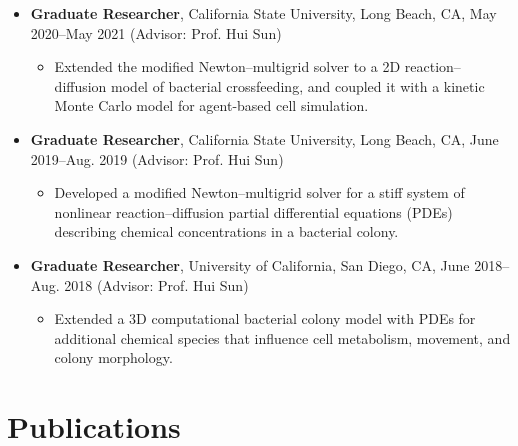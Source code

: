 \documentclass[11pt]{article}
\begin{document}
\begin{itemize}
\item {\bf Graduate Researcher}, California State University, Long
  Beach, CA, May 2020--May 2021 (Advisor: Prof. Hui Sun)
  \begin{itemize}
  \item Extended the modified Newton--multigrid solver to a 2D
    reaction--diffusion model of bacterial crossfeeding, and coupled it
    with a kinetic Monte Carlo model for agent-based cell simulation.
  \end{itemize}
\item {\bf Graduate Researcher}, California State University, Long
  Beach, CA, June 2019--Aug. 2019 (Advisor: Prof. Hui Sun)
  \begin{itemize}
  \item Developed a modified Newton--multigrid solver for a stiff system
    of nonlinear reaction--diffusion partial differential equations
    (PDEs) describing chemical concentrations in a bacterial colony.
  \end{itemize}
\item {\bf Graduate Researcher}, University of California, San Diego,
  CA, June 2018--Aug. 2018 (Advisor: Prof. Hui Sun)
  \begin{itemize}
  \item Extended a 3D computational bacterial colony model with PDEs for
    additional chemical species that influence cell metabolism,
    movement, and colony morphology.
  \end{itemize}
\end{itemize}

\section*{Publications}
\end{document}
